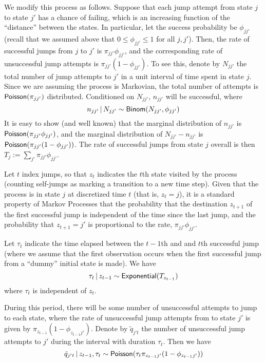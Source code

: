 We modify this process as follows.  Suppose that each jump attempt
from state $j$ to state $j'$ has a chance of failing, which is an
increasing function of the ``distance'' between the states.  In
particular, let the success probability be $\phi_{jj'}$ (recall that
we assumed above that $0 \leq \phi_{jj'} \leq 1$ for all $j,j'$).
Then, the rate of successful jumps from $j$ to $j'$ is
$\pi_{jj'}\phi_{jj'}$, and the corresponding rate of unsuccessful jump
attempts is $\pi_{jj'}(1-\phi_{jj'})$.  To see this, denote by
$N_{jj'}$ the total number of jump attempts to $j'$ in a unit interval
of time spent in state $j$.  Since we are assuming the process is
Markovian, the total number of attempts is $\mathsf{Poisson}(\pi_{jj'})$
distributed.  Conditioned on $N_{jj'}$, $n_{jj'}$ will be successful,
where
\begin{equation}
  \label{eq:51} n_{jj'} \, \vert \, N_{jj'} \sim
\mathsf{Binom}(N_{jj'},\phi_{jj'})
\end{equation} It is easy to show (and well known) that the marginal
distribution of $n_{jj'}$ is $\mathsf{Poisson}(\pi_{jj'}\phi_{jj'})$, and the
marginal distribution of $N_{jj'} - n_{jj'}$ is
$\mathsf{Poisson}(\pi_{jj'}(1-\phi_{jj'}))$.  The rate of successful jumps from
state $j$ overall is then $T_j := \sum_{j'} \pi_{jj'} \phi_{jj'}$.

Let $t$ index jumps, so that $z_t$ indicates the $t$th state visited
by the process (counting self-jumps as marking a transition to a new
time step).  Given that the process is in state $j$ at discretized
time $t$ (that is, $z_{t} = j$), it is a standard property of Markov
Processes that the probability that the destination $z_{t+1}$ of the
first successful jump is independent of the time since the last jump,
and the probability that $z_{t+1} = j'$ is proportional to the rate,
$\pi_{jj'}\phi_{jj'}$.

Let $\tau_{t}$ indicate the time elapsed between the $t-1$th and and
$t$th successful jump (where we assume that the first observation
occurs when the first successful jump from a ``dummy'' initial state
is made).  We have
\begin{equation}
  \label{eq:52} \tau_t \, \vert \, z_{t-1} \sim \mathsf{Exponential}(T_{z_{t-1}})
\end{equation} where $\tau_t$ is independent of $z_{t}$.

During this period, there will be some number of unsuccessful attempts
to jump to each state, where the rate of unsuccessful jump attempts
from to state $j'$ is given by $\pi_{z_{t-1}}(1 - \phi_{z_{t-1}j'})$.
Denote by $\tilde{q}_{j't}$ the number of unsuccessful jump attempts
to $j'$ during the interval with duration $\tau_t$.  Then we have
\begin{equation}
  \label{eq:53} \tilde{q}_{j't} \, \vert \, z_{t-1}, \tau_t \sim
\mathsf{Poisson}(\tau_t \pi_{z_{t-1}j'}(1-\phi_{z_{t-1}j'}))
\end{equation}

